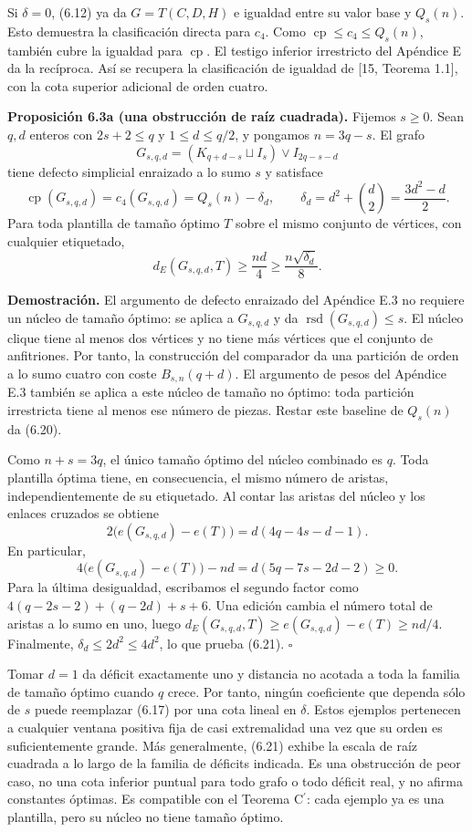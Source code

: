 \documentclass[spanish,11pt,a4paper]{article}
\begin{document}
Si \(\delta=0\), (6.12) ya da \(G=T(C,D,H)\) e igualdad entre su valor base y \(Q_s(n)\). Esto demuestra la clasificación directa para \(c_4\). Como \(\operatorname{cp}\le c_4\le Q_s(n)\), también cubre la igualdad para \(\operatorname{cp}\). El testigo inferior irrestricto del Apéndice E da la recíproca. Así se recupera la clasificación de igualdad de {[}15, Teorema 1.1{]}, con la cota superior adicional de orden cuatro.


\textbf{Proposición 6.3a (una obstrucción de raíz cuadrada).} Fijemos \(s\ge0\). Sean \(q,d\) enteros con \(2s+2\le q\) y \(1\le d\le q/2\), y pongamos \(n=3q-s\). El grafo \[
G_{s,q,d}=(K_{q+d-s}\sqcup I_s)\vee I_{2q-s-d}
\] tiene defecto simplicial enraizado a lo sumo \(s\) y satisface \[
\operatorname{cp}(G_{s,q,d})=c_4(G_{s,q,d})
=Q_s(n)-\delta_d,\qquad
\delta_d=d^2+\binom d2=\frac{3d^2-d}{2}.
\tag{6.20}
\] Para toda plantilla de tamaño óptimo \(T\) sobre el mismo conjunto de vértices, con cualquier etiquetado, \[
d_E(G_{s,q,d},T)\ge\frac{nd}{4}
\ge\frac{n\sqrt{\delta_d}}8.
\tag{6.21}
\]

\textbf{Demostración.} El argumento de defecto enraizado del Apéndice E.3 no requiere un núcleo de tamaño óptimo: se aplica a \(G_{s,q,d}\) y da \(\operatorname{rsd}(G_{s,q,d})\le s\). El núcleo clique tiene al menos dos vértices y no tiene más vértices que el conjunto de anfitriones. Por tanto, la construcción del comparador da una partición de orden a lo sumo cuatro con coste \(B_{s,n}(q+d)\). El argumento de pesos del Apéndice E.3 también se aplica a este núcleo de tamaño no óptimo: toda partición irrestricta tiene al menos ese número de piezas. Restar este baseline de \(Q_s(n)\) da (6.20).

Como \(n+s=3q\), el único tamaño óptimo del núcleo combinado es \(q\). Toda plantilla óptima tiene, en consecuencia, el mismo número de aristas, independientemente de su etiquetado. Al contar las aristas del núcleo y los enlaces cruzados se obtiene \[
2\bigl(e(G_{s,q,d})-e(T)\bigr)
=d(4q-4s-d-1).
\] En particular, \[
4\bigl(e(G_{s,q,d})-e(T)\bigr)-nd
=d(5q-7s-2d-2)\ge0.
\] Para la última desigualdad, escribamos el segundo factor como \(4(q-2s-2)+(q-2d)+s+6\). Una edición cambia el número total de aristas a lo sumo en uno, luego \(d_E(G_{s,q,d},T)\ge e(G_{s,q,d})-e(T)\ge nd/4\). Finalmente, \(\delta_d\le2d^2\le4d^2\), lo que prueba (6.21). \(\square\)

Tomar \(d=1\) da déficit exactamente uno y distancia no acotada a toda la familia de tamaño óptimo cuando \(q\) crece. Por tanto, ningún coeficiente que dependa sólo de \(s\) puede reemplazar (6.17) por una cota lineal en \(\delta\). Estos ejemplos pertenecen a cualquier ventana positiva fija de casi extremalidad una vez que su orden es suficientemente grande. Más generalmente, (6.21) exhibe la escala de raíz cuadrada a lo largo de la familia de déficits indicada. Es una obstrucción de peor caso, no una cota inferior puntual para todo grafo o todo déficit real, y no afirma constantes óptimas. Es compatible con el Teorema \texorpdfstring{C\ensuremath{^{\prime}}}{C'}: cada ejemplo ya es una plantilla, pero su núcleo no tiene tamaño óptimo.
\end{document}
